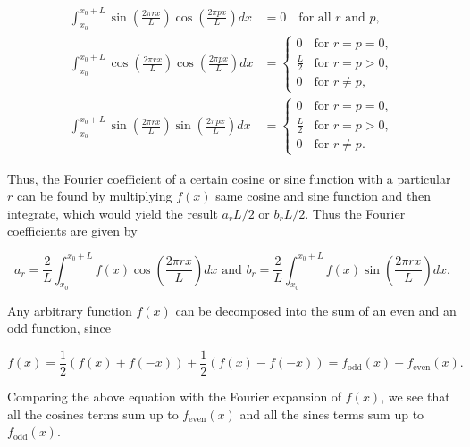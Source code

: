 \documentclass[english,a4paper,12pt]{report}
\begin{document}
\begin{equation}
    \begin{aligned}
        \int_{x_0}^{x_0+L} \sin\left(\frac{2\pi r x}{L}\right) \cos\left(\frac{2\pi p x}{L}\right) dx &= 0 \quad \text{for all } r \text{ and } p, \\
        \int_{x_0}^{x_0+L} \cos\left(\frac{2\pi r x}{L}\right) \cos\left(\frac{2\pi p x}{L}\right) dx &=
\begin{cases} 
    0 & \text{for } r = p = 0, \\
    \frac{L}{2} & \text{for } r = p > 0, \\
    0 & \text{for } r \neq p,
\end{cases} \\
\int_{x_0}^{x_0+L} \sin\left(\frac{2\pi r x}{L}\right) \sin\left(\frac{2\pi p x}{L}\right) dx &=
\begin{cases} 
    0 & \text{for } r = p = 0, \\
    \frac{L}{2} & \text{for } r = p > 0, \\
    0 & \text{for } r \neq p.
\end{cases}
    \end{aligned}
\end{equation}

Thus, the Fourier coefficient of a certain cosine or sine function with a particular \(r\) can be found by multiplying \(f(x)\) same cosine and sine function and then integrate, which would yield the result \(a_{r}L/2  \text { or } b_{r}L/2  \). Thus the Fourier coefficients are given by 

\begin{equation}
    a_{r} = \frac{2}{L} \int_{x_0}^{x_0 + L} f(x) \cos \left( \frac{2\pi rx}{L}  \right) dx \text { and } b_{r} = \frac{2}{L} \int_{x_0 }^{x_0 + L} f(x) \sin \left( \frac{2\pi rx}{L}  \right) dx.   
\end{equation}

Any arbitrary function \(f(x)\) can be decomposed into the sum of an even and an odd function, since

\begin{equation}
    f(x) = \frac{1}{2}(f(x) + f(-x)) + \frac{1}{2} (f(x) - f(-x)) = f_{\text{odd} }(x) + f_{\text{even} }(x).
\end{equation}

Comparing the above equation with the Fourier expansion of \(f(x)\), we see that all the cosines terms sum up to \(f_{\text{even}}(x)\) and all the sines terms sum up to \(f_{\text{odd} }(x)\). 
\end{document}
